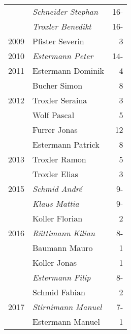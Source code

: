 {\begin{longtable}{ l l r }
                      & \emph{Schneider Stephan}                  & 16-         \\
                      & \emph{Troxler Benedikt}                   & 16-         \\
        2009          & Pfister Severin                           & 3           \\
        2010          & \emph{Estermann Peter}                    & 14-         \\
        2011          & Estermann Dominik                         & 4           \\
                      & Bucher Simon                              & 8           \\
        2012          & Troxler Seraina                           & 3           \\
                      & Wolf Pascal                               & 5           \\
                      & Furrer Jonas                              & 12          \\
                      & Estermann Patrick                         & 8           \\
        2013          & Troxler Ramon                             & 5           \\
                      & Troxler Elias                             & 3           \\
        2015          & \emph{Schmid André}                       & 9-          \\
                      & \emph{Klaus Mattia}                       & 9-          \\
                      & Koller Florian                            & 2           \\
        2016          & \emph{Rüttimann Kilian}                   & 8-          \\
                      & Baumann Mauro                             & 1           \\
                      & Koller Jonas                              & 1           \\
                      & \emph{Estermann Filip}                    & 8-          \\
                      & Schmid Fabian                             & 2           \\
        2017          & \emph{Stirnimann Manuel}                  & 7-          \\
                      & Estermann Manuel                          & 1           \\

\end{longtable}}
